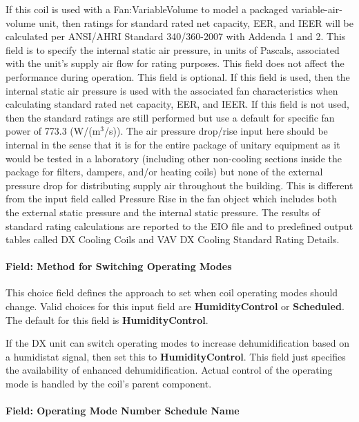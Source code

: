 If this coil is used with a Fan:VariableVolume to model a packaged variable-air-volume unit, then ratings for standard rated net capacity, EER, and IEER will be calculated per ANSI/AHRI Standard 340/360-2007 with Addenda 1 and 2. This field is to specify the internal static air pressure, in units of Pascals, associated with the unit's supply air flow for rating purposes. This field does not affect the performance during operation. This field is optional. If this field is used, then the internal static air pressure is used with the associated fan characteristics when calculating standard rated net capacity, EER, and IEER. If this field is not used, then the standard ratings are still performed but use a default for specific fan power of 773.3 (W/(m\(^{3}\)/s)). The air pressure drop/rise input here should be internal in the sense that it is for the entire package of unitary equipment as it would be tested in a laboratory (including other non-cooling sections inside the package for filters, dampers, and/or heating coils) but none of the external pressure drop for distributing supply air throughout the building. This is different from the input field called Pressure Rise in the fan object which includes both the external static pressure and the internal static pressure. The results of standard rating calculations are reported to the EIO file and to predefined output tables called DX Cooling Coils and VAV DX Cooling Standard Rating Details.

\paragraph{Field: Method for Switching Operating Modes}\label{field-method-for-switching-operating-modes}

This choice field defines the approach to set when coil operating modes should change. Valid choices for this input field are \textbf{HumidityControl} or \textbf{Scheduled}. The default for this field is \textbf{HumidityControl}.

If the DX unit can switch operating modes to increase dehumidification based on a humidistat signal, then set this to \textbf{HumidityControl}. This field just specifies the availability of enhanced dehumidification. Actual control of the operating mode is handled by the coil's parent component.

\paragraph{Field: Operating Mode Number Schedule Name}\label{field-operation-mode-number-schedule-name}

